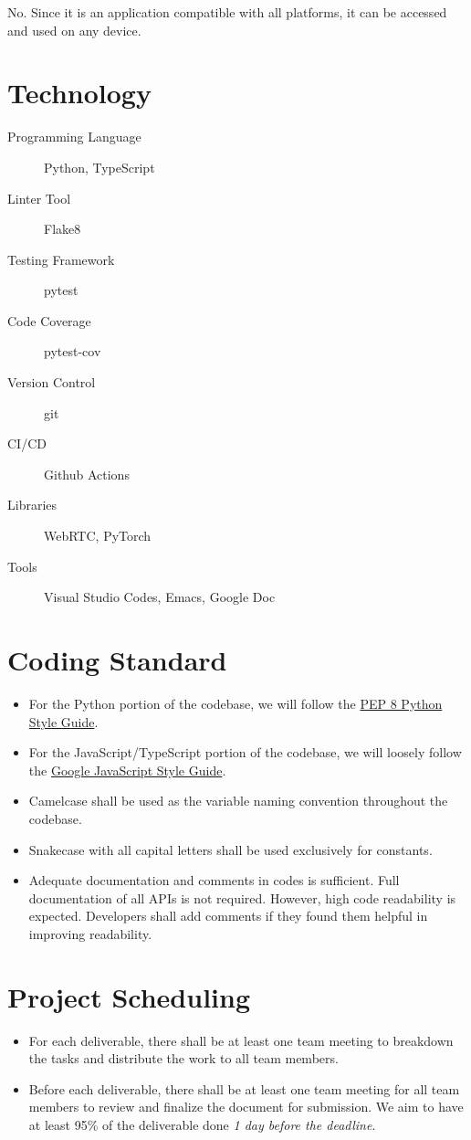 \documentclass{article}
\begin{document}
No. Since it is an application compatible with all platforms, it can be accessed
and used on any device.

\section{Technology}

\begin{description}
\item[Programming Language] Python, TypeScript
\item[Linter Tool] Flake8
\item[Testing Framework] pytest
\item[Code Coverage] pytest-cov
\item[Version Control] git
\item[CI/CD] Github Actions
\item[Libraries] WebRTC, PyTorch
\item[Tools] Visual Studio Codes, Emacs, Google Doc
\end{description}

\section{Coding Standard}

\begin{itemize}
\item For the Python portion of the codebase, we will follow the
  \href{https://peps.python.org/pep-0008/}{PEP 8 Python Style Guide}.
\item For the JavaScript/TypeScript portion of the codebase, we will loosely follow
  the \href{https://google.github.io/styleguide/jsguide.html}{Google JavaScript
    Style Guide}.
\item Camelcase shall be used as the variable naming convention throughout the
  codebase.
\item Snakecase with all capital letters shall be used exclusively for constants.
\item Adequate documentation and comments in codes is sufficient. Full
  documentation of all APIs is not required. However, high code readability is
  expected. Developers shall add comments if they found them helpful in
  improving readability.
\end{itemize}

\section{Project Scheduling}

\begin{itemize}
\item For each deliverable, there shall be at least one team meeting to breakdown
  the tasks and distribute the work to all team members.
\item Before each deliverable, there shall be at least one team meeting for all
  team members to review and finalize the document for submission. We aim to
  have at least 95\% of the deliverable done \emph{1 day before the deadline}.
\end{itemize}
\end{document}
